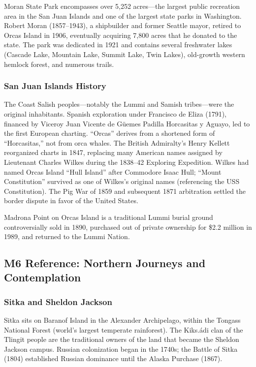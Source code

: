 \documentclass[11pt,letterpaper]{article}
\begin{document}
Moran State Park encompasses over 5,252 acres---the largest public recreation area in the San Juan Islands and one of the largest state parks in Washington. Robert Moran (1857--1943), a shipbuilder and former Seattle mayor, retired to Orcas Island in 1906, eventually acquiring 7,800 acres that he donated to the state. The park was dedicated in 1921 and contains several freshwater lakes (Cascade Lake, Mountain Lake, Summit Lake, Twin Lakes), old-growth western hemlock forest, and numerous trails.

\subsubsection{San Juan Islands History}
The Coast Salish peoples---notably the Lummi and Samish tribes---were the original inhabitants. Spanish exploration under Francisco de Eliza (1791), financed by Viceroy Juan Vicente de Güemes Padilla Horcasitas y Aguayo, led to the first European charting. ``Orcas'' derives from a shortened form of ``Horcasitas,'' not from orca whales. The British Admiralty's Henry Kellett reorganized charts in 1847, replacing many American names assigned by Lieutenant Charles Wilkes during the 1838--42 Exploring Expedition. Wilkes had named Orcas Island ``Hull Island'' after Commodore Isaac Hull; ``Mount Constitution'' survived as one of Wilkes's original names (referencing the USS Constitution). The Pig War of 1859 and subsequent 1871 arbitration settled the border dispute in favor of the United States.

Madrona Point on Orcas Island is a traditional Lummi burial ground controversially sold in 1890, purchased out of private ownership for \$2.2 million in 1989, and returned to the Lummi Nation.

\subsection{M6 Reference: Northern Journeys and Contemplation}

\subsubsection{Sitka and Sheldon Jackson}
Sitka sits on Baranof Island in the Alexander Archipelago, within the Tongass National Forest (world's largest temperate rainforest). The Kiks.ádi clan of the Tlingit people are the traditional owners of the land that became the Sheldon Jackson campus. Russian colonization began in the 1740s; the Battle of Sitka (1804) established Russian dominance until the Alaska Purchase (1867).
\end{document}
